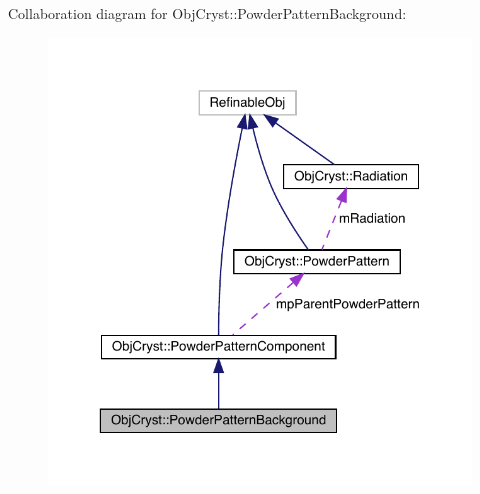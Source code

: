 Collaboration diagram for Obj\+Cryst\+::Powder\+Pattern\+Background\+:
\nopagebreak
\begin{figure}[H]
\begin{center}
\leavevmode
\includegraphics[width=323pt]{class_obj_cryst_1_1_powder_pattern_background__coll__graph}
\end{center}
\end{figure}
